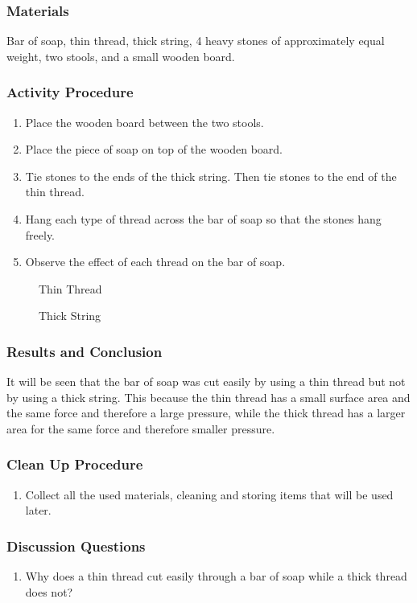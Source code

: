 \subsubsection*{Materials}
Bar of soap, thin thread, thick string, 4 heavy stones of approximately equal weight, two stools, and a small wooden board.

\subsubsection*{Activity Procedure}
\begin{enumerate}
\item{Place the wooden board between the two stools.}
\item{Place the piece of soap on top of the wooden board. }
\item{Tie stones to the ends of the thick string. Then tie stones to the end of the thin thread.} 
\item{Hang each type of thread across the bar of soap so that the stones hang freely.} 
\item{Observe the effect of each thread on the bar of soap.} 
\end{enumerate}

\begin{figure}
\begin{center}
\def\svgwidth{150pt}

\caption{Thin Thread}
\label{fig:pressure-solid1}
\end{center}
\end{figure}

\begin{figure}
\begin{center}
\def\svgwidth{150pt}

\caption{Thick String}
\label{fig:pressure-solid2}
\end{center}
\end{figure}

\subsubsection*{Results and Conclusion}
It will be seen that the bar of soap was cut easily by using a thin thread but not by using a thick string. This because the thin thread has a small surface area and the same force and therefore a large pressure, while the thick thread has a larger area for the same force and therefore smaller pressure. 

\subsubsection*{Clean Up Procedure}
\begin{enumerate}
\item{Collect all the used materials, cleaning and storing items that will be used later.} 
\end{enumerate}

\subsubsection*{Discussion Questions}
\begin{enumerate}
\item{Why does a thin thread cut easily through a bar of soap while a thick thread does not?}
\end{enumerate}

